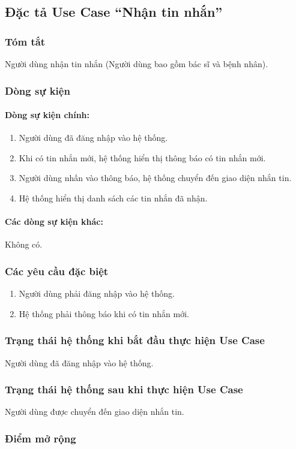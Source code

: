 \subsection{Đặc tả Use Case ``Nhận tin nhắn''}

\subsubsection{Tóm tắt}
Người dùng nhận tin nhắn (Người dùng bao gồm bác sĩ và bệnh nhân).

\subsubsection{Dòng sự kiện}
\paragraph{\textbf{Dòng sự kiện chính:}}
\begin{enumerate}
  \item Người dùng đã đăng nhập vào hệ thống.
  \item Khi có tin nhắn mới, hệ thống hiển thị thông báo có tin nhắn mới.
  \item Người dùng nhấn vào thông báo, hệ thống chuyển đến giao diện nhắn tin.
  \item Hệ thống hiển thị danh sách các tin nhắn đã nhận.
\end{enumerate}

\paragraph{\textbf{Các dòng sự kiện khác:}}
Không có.

\subsubsection{Các yêu cầu đặc biệt}
\begin{enumerate}
  \item Người dùng phải đăng nhập vào hệ thống.
  \item Hệ thống phải thông báo khi có tin nhắn mới.
\end{enumerate}

\subsubsection{Trạng thái hệ thống khi bắt đầu thực hiện Use Case}
Người dùng đã đăng nhập vào hệ thống.

\subsubsection{Trạng thái hệ thống sau khi thực hiện Use Case}
Người dùng được chuyển đến giao diện nhắn tin.

\subsubsection{Điểm mở rộng}